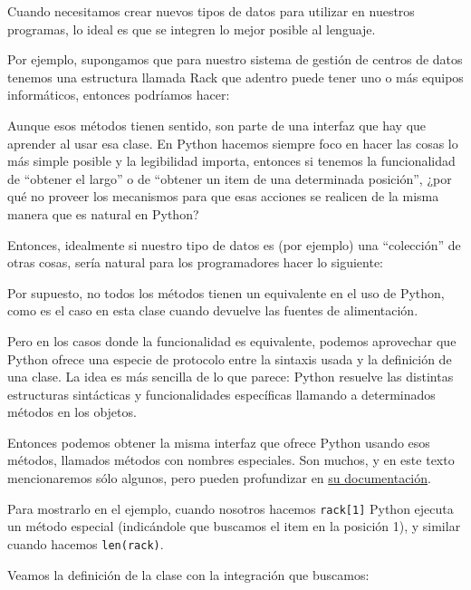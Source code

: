 Cuando necesitamos crear nuevos tipos de datos para utilizar en nuestros programas, lo ideal es que se integren lo mejor posible al lenguaje.

Por ejemplo, supongamos que para nuestro sistema de gestión de centros de datos tenemos una estructura llamada Rack que adentro puede tener uno o más equipos informáticos, entonces podríamos hacer:


Aunque esos métodos tienen sentido, son parte de una interfaz que hay que aprender al usar esa clase. En Python hacemos siempre foco en hacer las cosas lo más simple posible y la legibilidad importa, entonces si tenemos la funcionalidad de ``obtener el largo'' o de ``obtener un item de una determinada posición'', ¿por qué no proveer los mecanismos para que esas acciones se realicen de la misma manera que es natural en Python?

Entonces, idealmente si nuestro tipo de datos es (por ejemplo) una ``colección'' de otras cosas, sería natural para los programadores hacer lo siguiente:


Por supuesto, no todos los métodos tienen un equivalente en el uso de Python, como es el caso en esta clase cuando devuelve las fuentes de alimentación. 

Pero en los casos donde la funcionalidad es equivalente, podemos aprovechar que Python ofrece una especie de protocolo entre la sintaxis usada y la definición de una clase. La idea es más sencilla de lo que parece: Python resuelve las distintas estructuras sintácticas y funcionalidades específicas llamando a determinados métodos en los objetos.

Entonces podemos obtener la misma interfaz que ofrece Python usando esos métodos, llamados métodos con nombres especiales. Son muchos, y en este texto mencionaremos sólo algunos, pero pueden profundizar en \href{https://docs.python.org/es/dev/reference/datamodel.html#basic-customization}{su documentación}.

Para mostrarlo en el ejemplo, cuando nosotros hacemos \texttt{rack[1]} Python ejecuta un método especial (indicándole que buscamos el item en la posición 1), y similar cuando hacemos \texttt{len(rack)}.

Veamos la definición de la clase con la integración que buscamos:


